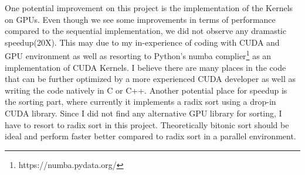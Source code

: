 \documentclass[11pt]{article}       %
\begin{document}
One potential improvement on this project is the implementation of the Kernels on GPUs. Even though we see some improvements in terms of performance compared to the sequential implementation, we did not observe any dramastic speedup(20X). This may due to my in-experience of coding with CUDA and GPU environment as well as resorting to Python's numba complier\footnote{https://numba.pydata.org/} as an implementation of CUDA Kernels. I believe there are many places in the code that can be further optimized by a more experienced CUDA developer as well as writing the code natively in C or C++. Another potential place for speedup is the sorting part, where currently it implements a radix sort using a drop-in CUDA library. Since I did not find any alternative GPU library for sorting, I have to resort to radix sort in this project. Theoretically bitonic sort should be ideal and perform faster better compared to radix sort in a parallel environment. 



\end{document}
